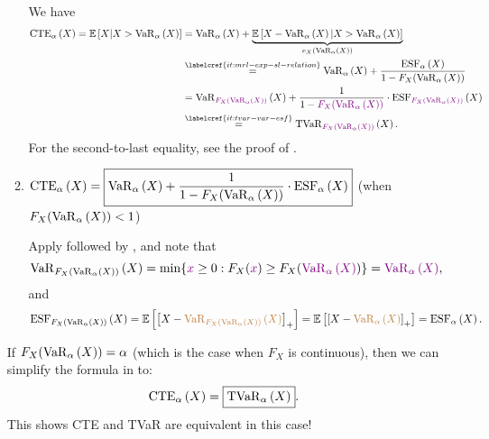 \begin{enumerate}
\begin{enumerate}
\begin{pf}
We have
\begin{align*}
\cte{\alpha}{X}=\expv{X|X>\vatr{\alpha}{X}}
&=\vatr{\alpha}{X}+\underbrace{\expv{X-\vatr{\alpha}{X}|X>\vatr{\alpha}{X}}}_{e_X(\vatr{\alpha}{X})} \\
&\overset{\labelcref{it:mrl-exp-sl-relation}}{=}\vatr{\alpha}{X}+\frac{\esf{\alpha}{X}}{1-F_X(\vatr{\alpha}{X})}\\
&=\vatr{\color{violet}F_X(\vatr{\alpha}{X})}{X}+\frac{1}{1-{\color{violet}F_X(\vatr{\alpha}{X})}}
\cdot \esf{\color{violet}F_X(\vatr{\alpha}{X})}{X}\\
&\overset{\labelcref{it:tvar-var-esf}}{=}\tvar{\color{violet}F_X(\vatr{\alpha}{X})}{X}.
\end{align*}
For the second-to-last equality, see the proof of .
\end{pf}

\item \label{it:cte-var-esf}
\(\displaystyle \operatorname{CTE}_{\alpha}\left(X\right)=\boxed{\operatorname{VaR}_{\alpha}\left(X\right)+\frac{1}{1-F_X(\operatorname{VaR}_{\alpha}\left(X\right))}\cdot \operatorname{ESF}_{\alpha}\left(X\right)}\) 
(when \(F_X(\operatorname{VaR}_{\alpha}\left(X\right))<1\))

\begin{pf}
Apply  followed by , and note that
\[
\operatorname{VaR}_{F_X(\operatorname{VaR}_{\alpha}\left(X\right))}\left(X\right)=\min\{{\color{violet}x}\ge 0:F_X({\color{violet}x})\ge F_X({\color{violet}\operatorname{VaR}_{\alpha}\left(X\right)})\}
={\color{violet}\operatorname{VaR}_{\alpha}\left(X\right)},
\]
and
\[
\operatorname{ESF}_{F_X(\operatorname{VaR}_{\alpha}\left(X\right))}\left(X\right)
=\mathbb{E}\left[\qty[X-{\color{brown}\operatorname{VaR}_{F_X(\operatorname{VaR}_{\alpha}\left(X\right))}\left(X\right)}]_{+}\right]
=\mathbb{E}\left[\qty[X-{\color{brown}\operatorname{VaR}_{\alpha}\left(X\right)}]_{+}\right]
=\operatorname{ESF}_{\alpha}\left(X\right).
\]
\end{pf}
\end{enumerate}
\begin{note}
If \(F_X(\operatorname{VaR}_{\alpha}\left(X\right))=\alpha\) (which is the case when \(F_X\) is
continuous), then we can simplify the formula in  to:
\[\operatorname{CTE}_{\alpha}\left(X\right)=\boxed{\operatorname{TVaR}_{\alpha}\left(X\right)}.\]
This shows CTE and TVaR are equivalent in this case!
\end{note}
\end{enumerate}
